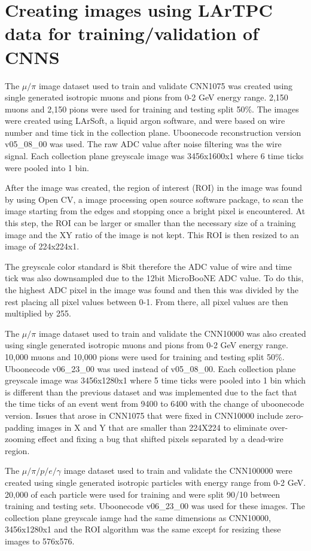 \section{Creating images using LArTPC data for training/validation of CNNS}\label{image_making}
The $\mu/\pi$ image dataset used to train and validate CNN1075 was created using single generated isotropic muons and pions from 0-2 GeV energy range. 2,150 muons and 2,150 pions were used for training and testing split 50\%. The images were created using LArSoft, a liquid argon software, and were based on wire number and time tick in the collection plane. Uboonecode reconstruction version v05{\_}08{\_}00 was used. The raw ADC value after noise filtering was the wire signal. Each collection plane greyscale image was 3456x1600x1 where 6 time ticks were pooled into 1 bin. 

After the image was created, the region of interest (ROI) in the image was found by using Open CV, a image processing open source software package, to scan the image starting from the edges and stopping once a bright pixel is encountered. At this step, the ROI can be larger or smaller than the necessary size of a training image and the XY ratio of the image is not kept. This ROI is then resized to an image of 224x224x1. 

The greyscale color standard is 8bit therefore the ADC value of wire and time tick was also downsampled due to the 12bit MicroBooNE ADC value. To do this, the highest ADC pixel in the image was found and then this was divided by the rest placing all pixel values between 0-1. From there, all pixel values are then multiplied by 255.

The $\mu/\pi$ image dataset used to train and validate the CNN10000 was also created using single generated isotropic muons and pions from 0-2 GeV energy range. 10,000 muons and 10,000 pions were used for training and testing split 50\%. Uboonecode v06{\_}23{\_}00 was used instead of v05{\_}08{\_}00. Each collection plane greyscale image was 3456x1280x1 where 5 time ticks were pooled into 1 bin which is different than the previous dataset and was implemented due to the fact that the time ticks of an event went from 9400 to 6400 with the change of uboonecode version. Issues that arose in CNN1075 that were fixed in CNN10000 include zero-padding images in X and Y that are smaller than 224X224 to eliminate over-zooming effect and fixing a bug that shifted pixels separated by a dead-wire region.

The $\mu/\pi/p/e/\gamma$ image dataset used to train and validate the CNN100000 were created using single generated isotropic particles with energy range from 0-2 GeV. 20,000 of each particle were used for training and were split 90/10 between training and testing sets. Uboonecode v06{\_}23{\_}00 was used for these images. The collection plane greyscale iamge had the same dimensions as CNN10000, 3456x1280x1 and the ROI algorithm was the same except for resizing these images to 576x576. 

